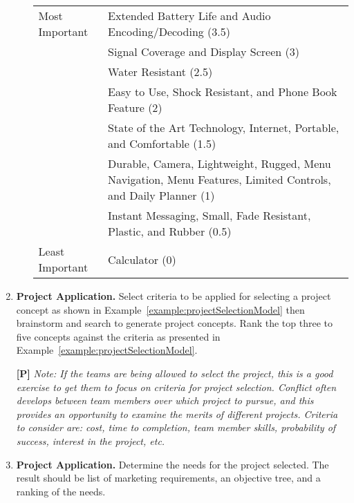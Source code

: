 \begin{enumerate}
\begin{onlysolution}
\begin{enumerate}
\begin{tabular}{lm{8cm}}
Most Important 	& Extended Battery Life and Audio Encoding/Decoding (3.5)			\\ 	
 & Signal Coverage and Display Screen (3)			\\    	
 &Water Resistant (2.5)			\\ 	
 & Easy to Use, Shock Resistant, and Phone Book Feature (2)			\\ 	
 & State of the Art Technology, Internet, Portable, and Comfortable (1.5)			\\  	
 &Durable, Camera, Lightweight, Rugged, Menu Navigation, Menu Features, Limited Controls, and Daily Planner (1)			\\ 	
& Instant Messaging, Small, Fade Resistant, Plastic, and Rubber (0.5)			\\ 	
Least Important & Calculator (0)			\\ 	
\end{tabular}


  \end{enumerate}
  \end{onlysolution}

\item
  \textbf{Project Application.} Select criteria to be applied for
  selecting a project concept as shown in Example~\ref{example:projectSelectionModel}
  then brainstorm and search to generate project concepts. Rank the top three to five
  concepts against the criteria as presented in Example~\ref{example:projectSelectionModel}.

  \begin{onlysolution}
  \textbf{[P]}
  \itshape
  \emph{Note:} If the teams are being allowed to select the project, this is a good exercise 
  to get them to focus on criteria for project selection. Conflict often develops between 
  team members over which project to pursue, and this provides an opportunity to examine the 
  merits of different projects. Criteria to consider are: cost, time to completion, team member 
  skills, probability of success, interest in the project, etc.
  \end{onlysolution}

\item
  \textbf{Project Application.} Determine the needs for the project
  selected. The result should be list of marketing requirements, an
  objective tree, and a ranking of the needs.


\end{enumerate}
